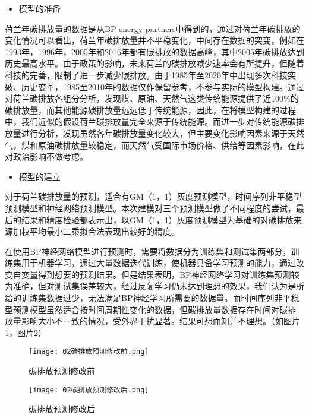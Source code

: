 \documentclass[bwprint]{gmcmthesis}
\numberwithin{figure}{section}
\begin{document}
\begin{itemize}
	\item 模型的准备
\end{itemize}
荷兰年碳排放量的数据是从\href{http://www.bp.com/statisticalreview}{BP energy partners}中得到的，通过对荷兰年碳排放的变化情况可以看出，荷兰年碳排放量并不平稳变化，中间存在数据的突变，例如在1993年，1996年，2005年和2016年都有碳排放的数据高峰，其中2005年碳排放达到历史最高水平。由于政策的影响，未来荷兰的碳排放减少速率会有所提升，但随着科技的完善，限制了进一步减少碳排放。由于1985年至2020年中出现多次科技突破、历史变革，1985至2010年的数据仅作保留参考，不参与实际的模型构建。通过对荷兰碳排放各组分分析，发现煤、原油、天然气这类传统能源提供了近100\%的碳排放量，而其他能源碳排放量远远低于传统能源，因此，在将模型构建的过程中，我们近似的假设荷兰碳排放量完全来源于传统能源。而进一步对传统能源碳排放量进行分析，发现虽然各年碳排放量变化较大，但主要变化影响因素来源于天然气，煤和原油碳排放量较稳定，而天然气受国际市场价格、供给等因素影响，在此对政治影响不做考虑。

\begin{itemize}
	\item 模型的建立
\end{itemize}
对于荷兰碳排放量的预测，适合有GM（1，1）灰度预测模型，时间序列非平稳型预测模型和神经网络预测模型。本次建模对三个预测模型做了不同程度的尝试，最后的结果和精度检验都表示出，以GM（1，1）灰度预测模型为基础的对碳排放来源加权平均最小二乘拟合法表现出较好的精度。

在使用BP神经网络模型进行预测时，需要将数据分为训练集和测试集两部分，训练集用于机器学习，通过大量数据迭代训练，使机器具备学习预测的能力，通过改变自变量得到想要的预测结果。但是结果表明，BP神经网络学习对训练集预测较为准确，但对测试集误差较大，经过反复学习仍未达到理想的效果，我们认为是所给的训练集数据过少，无法满足BP神经学习所需要的数据量。而时间序列非平稳型预测模型虽然适合按时间周期性变化的数据，但碳排放量数据存在时间对碳排
放量影响大小不一致的情况，受外界干扰显著。结果可想而知并不理想。（如图片\ref{fig_{4}}，图片\ref{fig_{5}}）

		\begin{figure}[!h]
			\centering
			\texttt{[image: 02碳排放预测修改前.png]}
			\caption{碳排放预测修改前}
			\label{fig_{4}}
		\end{figure}
		\begin{figure}[!h]
			\centering
			\texttt{[image: 02碳排放预测修改后.png]}
			\caption{碳排放预测修改后}
			\label{fig_{5}}
		\end{figure}
\end{document}
